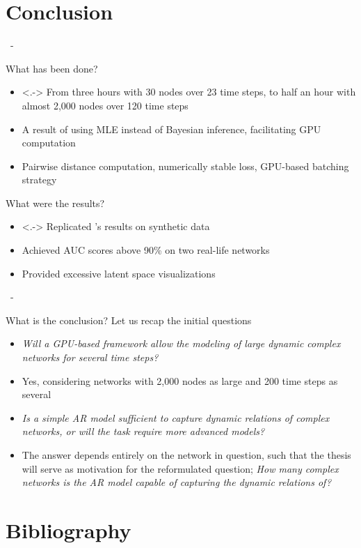 \documentclass{beamer}
\newenvironment{xframe}
    {\begin{frame}{
        \ifx\insertsubsection\empty
            \strut
        \else\ifx\insertsubsubsection\empty
            \insertsection
        \else
            \insertsection~-~\insertsubsection
        \fi\fi
    }{
        \ifx\insertsubsection\empty
            \insertsection
        \else\ifx\insertsubsubsection\empty
            \insertsubsection
        \else
            \insertsubsubsection
        \fi\fi
    }}
    {\end{frame}}
\newenvironment{xblock}[1]
    {\begin{block}{#1}}
    {\end{block}}
\begin{document}
\section{Conclusion}

    \begin{xframe}
        \begin{xblock}{What has been done?}
            \begin{itemize}
                \item<.-> From three hours with 30 nodes over 23 time steps, to half an hour with almost 2,000 nodes over 120 time steps
                \item A result of using MLE instead of Bayesian inference, facilitating GPU computation
                \item Pairwise distance computation, numerically stable loss, GPU-based batching strategy
            \end{itemize}
        \end{xblock}
        
        \begin{xblock}{What were the results?}
            \begin{itemize}
                \item<.-> Replicated \citeauthor{zangenberg2018a}'s results on synthetic data
                \item Achieved AUC scores above 90\% on two real-life networks
                \item Provided excessive latent space visualizations
            \end{itemize}
        \end{xblock}
    \end{xframe}
    
    \begin{xframe}
        \begin{xblock}{What is the conclusion?}
            Let us recap the initial questions
            \begin{itemize}
                \item \textit{Will a GPU-based framework allow the modeling of large dynamic complex networks for several time steps?}
                \item[] Yes, considering networks with 2,000 nodes as large and 200 time steps as several
                \item \textit{Is a simple AR model sufficient to capture dynamic relations of complex networks, or will the task require more advanced models?}
                \item[] The answer depends entirely on the network in question, such that the thesis will serve as motivation for the reformulated question; \onslide<+-> \textit{How many complex networks is the AR model capable of capturing the dynamic relations of?}
            \end{itemize}
        \end{xblock}
    \end{xframe}
    
\section*{Bibliography}

    \begin{frame}{\strut}{\insertsection}
        \printbibliography
    \end{frame}
    
\end{document}
